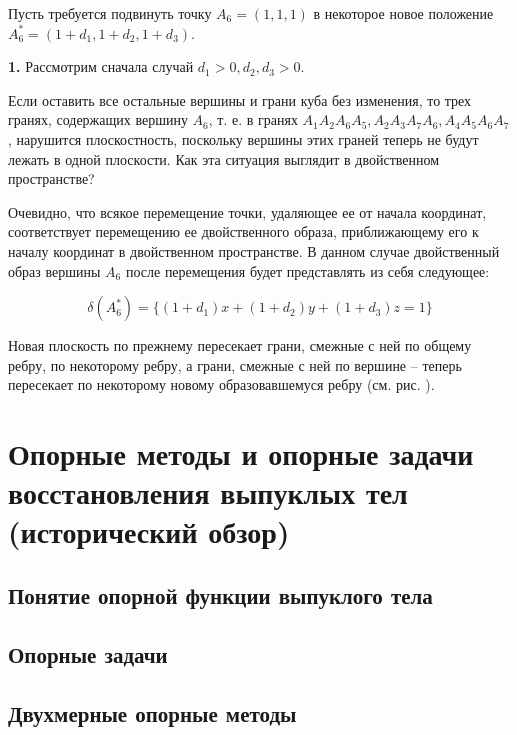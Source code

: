 \documentclass[a4paper, 12pt, titlepage]{article}
\theoremstyle{definition}
\theoremstyle{plain}
\theoremstyle{plain}
\begin{document}

Пусть требуется подвинуть точку $A_{6} = (1, 1, 1)$ в некоторое новое положение
$A_{6}^{*} = (1 + d_{1}, 1 + d_{2}, 1 + d_{3})$.

\textbf{1. } Рассмотрим сначала случай $d_{1} > 0, d_{2}, d_{3} > 0$.

Если оставить все остальные вершины и грани куба без изменения, то трех гранях,
содержащих вершину $A_{6}$, т. е. в гранях
$A_{1} A_{2} A_{6} A_{5}, A_{2} A_{3} A_{7} A_{6}, A_{4} A_{5} A_{6} A_{7}$,
нарушится плоскостность, поскольку вершины этих граней теперь не будут лежать в
одной плоскости. Как эта ситуация выглядит в двойственном пространстве?

Очевидно, что всякое перемещение точки, удаляющее ее от начала координат,
соответствует перемещению ее двойственного образа, приближающему его к началу
координат в двойственном пространстве. В данном случае двойственный образ
вершины $A_{6}$ после перемещения будет представлять из себя следующее:

\begin{equation*}
 \delta(A_{6}^{*}) = \{ (1 + d_{1}) x + (1 + d_{2}) y + (1 + d_{3}) z = 1 \}
\end{equation*}

Новая плоскость по прежнему пересекает грани, смежные с ней по общему ребру, по
некоторому ребру, а грани, смежные с ней по вершине -- теперь пересекает по
некоторому новому образовавшемуся ребру (см. рис. ).


\section{Опорные методы и опорные задачи восстановления выпуклых
тел (исторический обзор)}

\subsection{Понятие опорной функции выпуклого тела}

\subsection{Опорные задачи}

\subsection{Двухмерные опорные методы}
\end{document}
